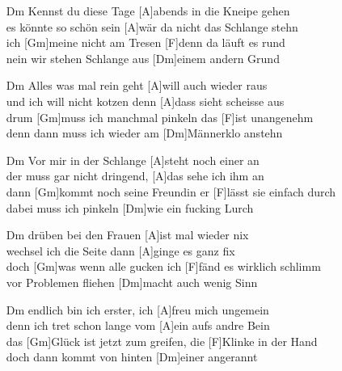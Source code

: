 \def\Titel{Schlangestehn am Männerklo}
\def\Interpret{Die BÄND}
\def\Referenz{Die Ballade vom großen Leid}

\LiedSetup{}

\begin{guitarMagic}
    \begin{enumerate}
        \item [Dm]Kennst du diese Tage [A]abends in die Kneipe gehen\\
            [F]es könnte so schön sein [A]wär da nicht das Schlange stehn\\
            ich [Gm]meine nicht am Tresen [F]denn da läuft es rund\\
            [A]nein wir stehen Schlange aus [Dm]einem andern Grund\\

        \item [Dm]Alles was mal rein geht [A]will auch wieder raus\\
            [F]und ich will nicht kotzen denn [A]dass sieht scheisse aus\\
            drum [Gm]muss ich manchmal pinkeln das [F]ist unangenehm\\
            [A]denn dann muss ich wieder am [Dm]Männerklo anstehn\\

        \item [Dm]Vor mir in der Schlange [A]steht noch einer an\\
            [F]der muss gar nicht dringend, [A]das sehe ich ihm an\\
            dann [Gm]kommt noch seine Freundin er [F]lässt sie einfach durch\\
            [A]dabei muss ich pinkeln [Dm]wie ein fucking Lurch\\

        \item [Dm]drüben bei den Frauen  [A]ist mal wieder nix\\
            [F]wechsel ich die Seite dann [A]ginge es ganz fix\\
            doch [Gm]was wenn alle gucken  ich [F]fänd es wirklich schlimm\\
            [A]vor  Problemen fliehen [Dm]macht auch wenig Sinn\\

        \item [Dm]endlich bin ich erster, ich [A]freu mich ungemein\\
            [F]denn ich tret schon lange vom [A]ein aufs andre Bein\\
            das [Gm]Glück ist jetzt zum greifen, die [F]Klinke in der Hand\\
            [A]doch dann kommt von hinten [Dm]einer angerannt\\


\end{enumerate}
\end{guitarMagic}
